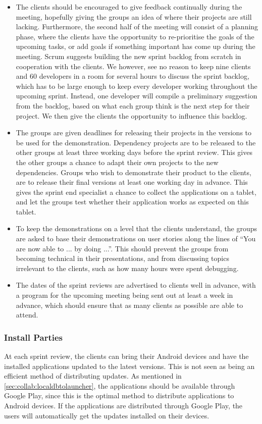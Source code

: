 \begin{itemize}
	\item The clients should be encouraged to give feedback continually during the meeting, hopefully giving the groups an idea of where their projects are still lacking.
	Furthermore, the second half of the meeting will consist of a planning phase, where the clients have the opportunity to re-prioritise the goals of the upcoming tasks, or add goals if something important has come up during the meeting.
	Scrum suggests building the new sprint backlog from scratch in cooperation with the clients.
	We however, see no reason to keep nine clients and 60 developers in a room for several hours to discuss the sprint backlog, which has to be large enough to keep every developer working throughout the upcoming sprint.
	Instead, one developer will compile a preliminary suggestion from the backlog, based on what each group think is the next step for their project.
	We then give the clients the opportunity to influence this backlog.
	\item The groups are given deadlines for releasing their projects in the versions to be used for the demonstration.
	Dependency projects are to be released to the other groups at least three working days before the sprint review.
	This gives the other groups a chance to adapt their own projects to the new dependencies.
	Groups who wish to demonstrate their product to the clients, are to release their final versions at least one working day in advance.
	This gives the sprint end specialist a chance to collect the applications on a tablet, and let the groups test whether their application works as expected on this tablet. 
	\item To keep the demonstrations on a level that the clients understand, the groups are asked to base their demonstrations on user stories along the lines of ``You are now able to ... by doing ...''.
	This should prevent the groups from becoming technical in their presentations, and from discussing topics irrelevant to the clients, such as how many hours were spent debugging. 
	\item The dates of the sprint reviews are advertised to clients well in advance, with a program for the upcoming meeting being sent out at least a week in advance, which should ensure that as many clients as possible are able to attend. 
\end{itemize}

\subsubsection{Install Parties}
At each sprint review, the clients can bring their Android devices and have the installed \giraf applications updated to the latest versions.
This is not seen as being an efficient method of distributing updates.
As mentioned in \cref{sec:collab:localdbtolauncher}, the applications should be available through Google Play, since this is the optimal method to distribute applications to Android devices.
If the applications are distributed through Google Play, the users will automatically get the updates installed on their devices.

